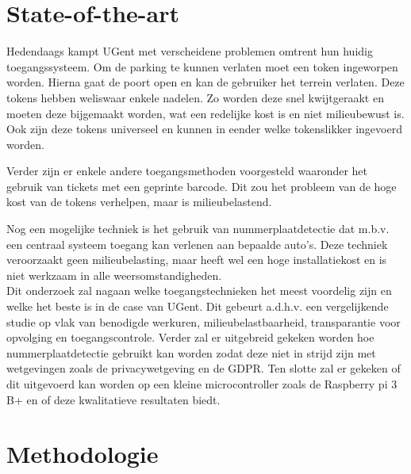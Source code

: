 
\section{State-of-the-art}
\label{sec:state-of-the-art}


Hedendaags kampt UGent met verscheidene problemen omtrent hun huidig toegangssysteem. Om de parking te kunnen verlaten moet een token ingeworpen worden. Hierna gaat de poort open en kan de gebruiker het terrein verlaten. Deze tokens hebben weliswaar enkele nadelen. Zo worden deze snel kwijtgeraakt en moeten deze bijgemaakt worden, wat een redelijke kost is en niet milieubewust is. Ook zijn deze tokens universeel en kunnen in eender welke tokenslikker ingevoerd worden.

Verder zijn er enkele andere toegangsmethoden voorgesteld waaronder het gebruik van tickets met een geprinte barcode. Dit zou het probleem van de hoge kost van de tokens verhelpen, maar is milieubelastend.

Nog een mogelijke techniek is het gebruik van nummerplaatdetectie dat m.b.v. een centraal systeem toegang kan verlenen aan bepaalde auto’s. Deze techniek veroorzaakt geen milieubelasting, maar heeft wel een hoge installatiekost en is niet werkzaam in alle weersomstandigheden. \autocite{azam2016automatic}
\\
Dit onderzoek zal nagaan welke toegangstechnieken het meest voordelig zijn en welke het beste is in de case van UGent. Dit gebeurt a.d.h.v. een vergelijkende studie op vlak van benodigde werkuren, milieubelastbaarheid, transparantie voor opvolging en toegangscontrole. Verder zal er uitgebreid gekeken worden hoe nummerplaatdetectie gebruikt kan worden zodat deze niet in strijd zijn met wetgevingen zoals de privacywetgeving en de GDPR. Ten slotte zal er gekeken of dit uitgevoerd kan worden op een kleine microcontroller zoals de Raspberry pi 3 B+ en of deze kwalitatieve resultaten biedt.


\section{Methodologie}
\label{sec:methodologie}


